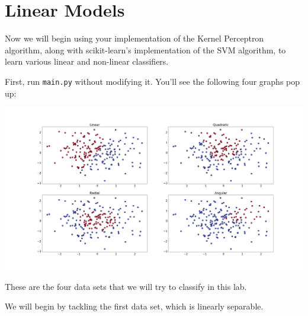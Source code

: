 \documentclass{article}
\begin{document}

\section{Linear Models} \label{linear}

Now we will begin using your implementation of the Kernel Perceptron algorithm, along with scikit-learn's implementation of the SVM algorithm, to learn various linear and non-linear classifiers.

First, run \texttt{main.py} without modifying it. You'll see the following four graphs pop up:

\noindent
\includegraphics[width=\textwidth]{datasets.png}

These are the four data sets that we will try to classify in this lab.

\vspace{2mm}

We will begin by tackling the first data set, which is linearly separable.
\end{document}
